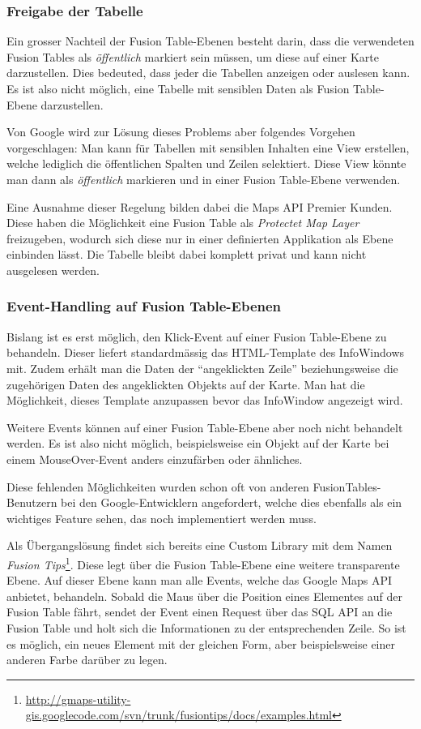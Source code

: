 \subsubsection{Freigabe der Tabelle}
Ein grosser Nachteil der Fusion Table-Ebenen besteht darin, dass die verwendeten Fusion Tables als  \emph{öffentlich} markiert sein müssen, um diese auf einer Karte darzustellen. Dies bedeuted, dass jeder die Tabellen anzeigen oder auslesen kann. Es ist also nicht möglich, eine Tabelle mit sensiblen Daten als Fusion Table-Ebene darzustellen.

Von Google wird zur Lösung dieses Problems aber folgendes Vorgehen vorgeschlagen: Man kann für Tabellen mit sensiblen Inhalten eine View erstellen, welche lediglich die öffentlichen Spalten und Zeilen selektiert. Diese View könnte man dann als \emph{öffentlich} markieren und in einer Fusion Table-Ebene verwenden.

Eine Ausnahme dieser Regelung bilden dabei die Maps \gls{API} Premier Kunden. Diese haben die Möglichkeit eine Fusion Table als \emph{Protectet Map Layer} freizugeben, wodurch sich diese nur in einer definierten Applikation als Ebene einbinden lässt. Die Tabelle bleibt dabei komplett privat und kann nicht ausgelesen werden.

\subsubsection{Event-Handling auf Fusion Table-Ebenen}
Bislang ist es erst möglich, den Klick-Event auf einer Fusion Table-Ebene zu behandeln. Dieser liefert standardmässig das HTML-Template des InfoWindows mit. Zudem erhält man die Daten der "`angeklickten Zeile"' beziehungsweise die zugehörigen Daten des angeklickten Objekts auf der Karte. Man hat die Möglichkeit, dieses Template anzupassen bevor das InfoWindow angezeigt wird.

Weitere Events können auf einer Fusion Table-Ebene aber noch nicht behandelt werden. Es ist also nicht möglich, beispielsweise ein Objekt auf der Karte bei einem MouseOver-Event anders einzufärben oder ähnliches.

Diese fehlenden Möglichkeiten wurden schon oft von anderen FusionTables-Benutzern bei den Google-Entwicklern angefordert, welche dies ebenfalls als ein wichtiges Feature sehen, das noch implementiert werden muss.

Als Übergangslösung findet sich bereits eine Custom Library mit dem Namen \emph{Fusion Tips}\footnote{\url{http://gmaps-utility-gis.googlecode.com/svn/trunk/fusiontips/docs/examples.html}}. Diese legt über die Fusion Table-Ebene eine weitere transparente Ebene. Auf dieser Ebene kann man alle Events, welche das Google Maps \gls{API} anbietet, behandeln. Sobald die Maus über die Position eines Elementes auf der Fusion Table fährt, sendet der Event einen Request über das SQL \gls{API} an die Fusion Table und holt sich die Informationen zu der entsprechenden Zeile. So ist es möglich, ein neues Element mit der gleichen Form, aber beispielsweise einer anderen Farbe darüber zu legen.

